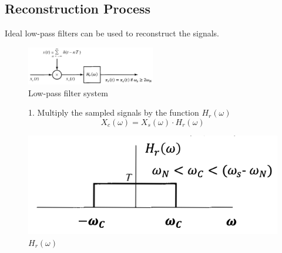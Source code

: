 \subsection{Reconstruction Process}
Ideal low-pass filters can be used to reconstruct the signals.
\begin{figure}[H]\centering
\includegraphics[width = 0.5\textwidth]{images/lowpass}
\caption{Low-pass filter system} \end{figure}

\begin{figure}[H]
\begin{minipage}{0.6\textwidth}
1. Multiply the sampled signals by the function $H_{r}(\omega)$ \\
\[ X_{c}(\omega) = X_{s}(\omega) \cdot H_{r}(\omega) \]
\end{minipage} \hfill
\begin{minipage}{0.5\textwidth}
\includegraphics[width = \textwidth]{images/homega}
\caption{$H_{r}(\omega)$}
\end{minipage}\end{figure}

